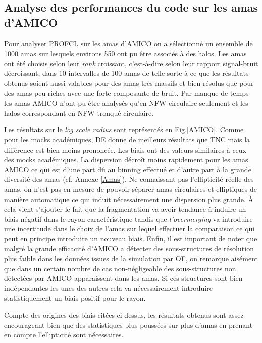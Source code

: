 \documentclass[a4paper,11pt]{article}
\numberwithin{equation}{section}
\begin{document}
    \subsection{Analyse des performances du code sur les amas d'AMICO}
      Pour analyser PROFCL sur les amas d'AMICO on a sélectionné un ensemble de 1000 amas sur lesquels environs 550 ont pu être associés à des halos. Les amas ont été choisis selon leur \textit{rank} croissant, c'est-à-dire selon leur rapport signal-bruit décroissant, dans 10 intervalles de 100 amas de telle sorte à ce que les résultats obtenus soient aussi valables pour des amas très massifs et bien résolus que pour des amas peu riches avec une forte composante de bruit. Par manque de temps les amas AMICO n'ont pu être analysés qu'en NFW circulaire seulement et les halos correspondant en NFW tronqué circulaire. \par
      Les résultats sur le \textit{log scale radius} sont représentés en Fig.\ref{AMICO}. Comme pour les mocks académiques, DE donne de meilleurs résultats que TNC mais la différence est bien moins prononcée. Les biais ont des valeurs similaires à ceux des mocks académiques. La dispersion décroît moins rapidement pour les amas AMICO ce qui est d'une part dû au binning effectué et d'autre part à la grande diversité des amas (cf. Annexe \ref{Amas}). Ne connaissant pas l'ellipticité réelle des amas, on n'est pas en mesure de pouvoir séparer amas circulaires et elliptiques de manière automatique ce qui induit nécessairement une dispersion plus grande. À cela vient s'ajouter le fait que la fragmentation va avoir tendance à induire un biais négatif dans le rayon caractéristique tandis que \textit{l'overmerging} va introduire une incertitude dans le choix de l'amas sur lequel effectuer la comparaison ce qui peut en principe introduire un nouveau biais. Enfin, il est important de noter que malgré la grande efficacité d'AMICO a détecter des sous-structures de résolution plus faible dans les données issues de la simulation par OF, on remarque aisément que dans un certain nombre de cas non-négligeable des sous-structures non détectées par AMICO apparaissent dans les amas. Si ces structures sont bien indépendantes les unes des autres cela va nécessairement introduire statistiquement un biais positif pour le rayon. \par
    Compte des origines des biais citées ci-dessus, les résultats obtenus sont assez encourageant bien que des statistiques plus poussées sur plus d'amas en prenant en compte l'ellipticité sont nécessaires. 
    
\end{document}
